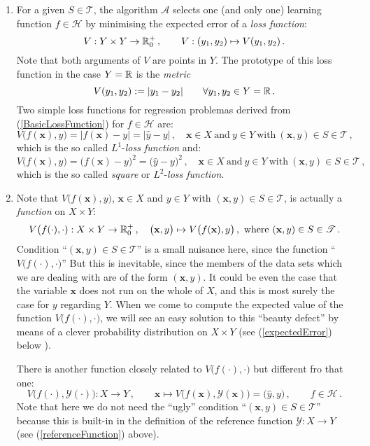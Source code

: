 \begin{description}[style=unboxed,leftmargin=0cm,itemsep=3ex]
\begin{enumerate}
\item\label{lossFunction}
For a given $S\in\mathscr{T}$, the algorithm $\mathcal{A}$ selects
one (and only one) learning function $f\in\mathscr{H}$ by minimising
the expected error of a {\em loss function\/}:
$$
V:Y\times Y\to{\mathbb R }_0^+\,,\qquad V: (y_1,y_2)\mapsto V(y_1,y_2)\,.
$$
Note that both arguments of $V$ are points in $Y$.
The prototype of this loss function in the case $Y={\mathbb R }$ is the {\em metric\/}
\begin{equation}\label{BasicLossFunction}
V(y_1,y_2):=|y_1-y_2|\qquad \forall y_1,y_2\in Y={\mathbb R }\,. 
\end{equation} 
Two simple loss functions for regression problemas derived from
(\ref{BasicLossFunction}) for $f\in\mathscr{H}$ are:
$$
V\big( f(\mathbf{x}),y \big) 
= |f(\mathbf{x})-y| = |\widehat{y}-y|\,,\quad 
\mathbf{x}\in X\ \text{and}\ y\in Y\ 
\text{with}\ (\mathbf{x},y)\in S\in\mathscr{T}\,,
$$
which is the so called $L^1$-{\em loss function\/} and:
$$
V\big( f(\mathbf{x}),y \big) 
= \big(f(\mathbf{x})-y\big)^2 = \big( \widehat{y}-y\big)^2\,,\quad 
\mathbf{x}\in X\ \text{and}\ y\in Y\ 
\text{with}\ (\mathbf{x},y)\in S\in\mathscr{T}\,,
$$
which is the so called {\em square\/} or $L^2$-{\em loss function\/}.

\item
Note that $V\big( f(\mathbf{x}),y \big)$, $\mathbf{x}\in X$ and $y\in Y$ 
with $(\mathbf{x},y)\in S\in\mathscr{T}$, is actually a {\em function\/}
on $X\times Y$:
$$
V\big(f(\mathbf{\cdot}),\cdot):X\times Y\to\R_0^+\,,\quad
\big( \mathbf{x},y \big) \mapsto V\big( f(\mathbf{x}),y \big)\,,\ 
\text{where}\ (\mathbf{x},y)\in S\in\mathscr{T}\,.
$$
Condition ``$(\mathbf{x},y)\in S\in\mathscr{T}$'' is a small nuisance here,
since the function ``$V\big(f(\mathbf{\cdot}),\cdot)$''  
But this is inevitable, since the members of the data sets which we are
dealing with are of the form $(\mathbf{x},y)$.
It could be even the case that the variable $\mathbf{x}$ does not run on
the whole of $X$, and this is most surely the case for $y$ regarding $Y$.
When we come to compute the expected value of the function
$V\big(f(\mathbf{\cdot}),\cdot)$, we will see an easy solution to
this ``beauty defect'' by means of a clever probability distribution on
$X\times Y$ (see (\ref{expectedError}) below ).

There is another function closely related to $V\big(f(\mathbf{\cdot}),\cdot)$
but different fro that one:
$$
V\big(f(\cdot), \mathscr{Y}(\cdot)\big):X\to Y\,,\qquad
\mathbf{x}\mapsto V\big(f(\mathbf{x}), \mathscr{Y}(\mathbf{x})\big)
= \big( \widehat{y}, y \big)\,,\qquad f\in\mathscr{H}\,.
$$
Note that here we do not need the ``ugly'' condition
``$(\mathbf{x},y)\in S\in\mathscr{T}$'' because this is built-in in the
definition of the reference function $\mathscr{Y}:X\to Y$
(see (\ref{referenceFunction}) above).


\end{enumerate}
\end{description}
